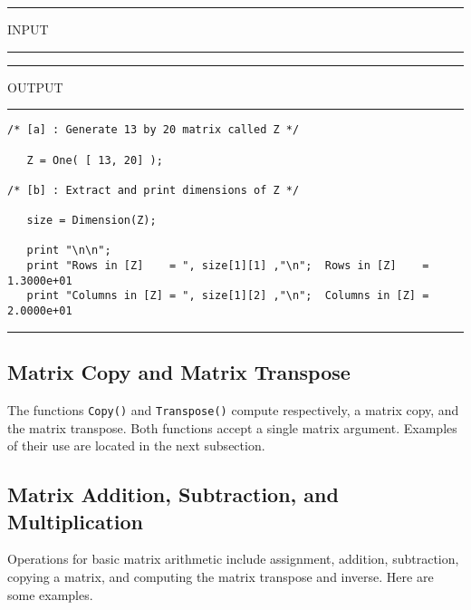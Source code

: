 \vspace{0.15 in}
\begin{footnotesize}
\noindent
\rule{1.2 in}{0.035 in} INPUT \rule{1.2 in}{0.035 in}\hspace{0.1 in}
\rule{1.3 in}{0.035 in} OUTPUT\rule{1.3 in}{0.035 in}
\begin{verbatim}
/* [a] : Generate 13 by 20 matrix called Z */

   Z = One( [ 13, 20] );

/* [b] : Extract and print dimensions of Z */

   size = Dimension(Z);

   print "\n\n";
   print "Rows in [Z]    = ", size[1][1] ,"\n";  Rows in [Z]    =     1.3000e+01 
   print "Columns in [Z] = ", size[1][2] ,"\n";  Columns in [Z] =     2.0000e+01 
\end{verbatim}
\rule{6.25 in}{0.035 in}
\end{footnotesize}

\subsection{Matrix Copy and Matrix Transpose}

\vspace{0.15 in}
\noindent\hspace{0.50 in}
The functions {\tt Copy()} and {\tt Transpose()} compute respectively,
a matrix copy, and the matrix transpose.
Both functions accept a single matrix argument.
Examples of their use are located in the next subsection.

\subsection{Matrix Addition, Subtraction, and Multiplication}

\vspace{0.15 in}
\noindent\hspace{0.50 in}
Operations for basic matrix arithmetic include
assignment, addition, subtraction, copying a matrix,
and computing the matrix transpose and inverse.
Here are some examples.


